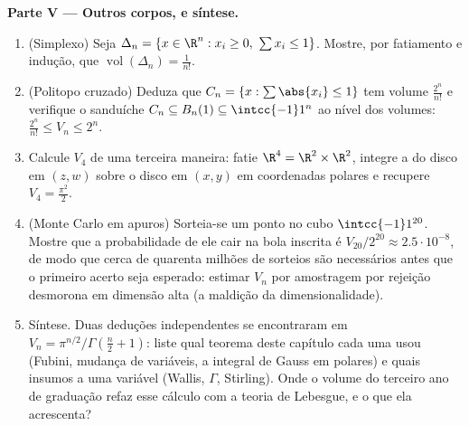 \begin{problem}[{Problema de fim de semana --- $V_n =
\pi^{n/2}/\Gamma(\frac n2 + 1)$, e a estranheza das
dimensões altas}]
\medskip
\noindent\textbf{Parte V --- Outros corpos, e síntese.}
\begin{enumerate}[resume]
  \item (Simplexo) Seja $\Delta_n = \{x \in \R^n : x_i \geq 0,\
        \sum x_i \leq 1\}$. Mostre, por fatiamento e indução, que
        $\operatorname{vol}(\Delta_n) = \frac1{n!}$.
  \item (Politopo cruzado) Deduza que $C_n = \{x :
        \sum\abs{x_i} \leq 1\}$ tem volume $\frac{2^n}{n!}$
        e verifique o sanduíche $C_n \subseteq B_n(1)
        \subseteq \intcc{-1}1^n$ ao nível dos volumes:
        $\frac{2^n}{n!} \leq V_n \leq 2^n$.
  \item Calcule $V_4$ de uma terceira maneira: fatie $\R^4 = \R^2 \times
        \R^2$, integre a \omterm{def:b2:multint:domain}{área} do disco em $(z, w)$ sobre
        o disco em $(x, y)$ em coordenadas polares e recupere
        $V_4 = \frac{\pi^2}2$.
  \item (Monte Carlo em apuros) Sorteia-se um ponto 
        no cubo $\intcc{-1}1^{20}$. Mostre que a
        probabilidade de ele cair na bola inscrita é
        $V_{20}/2^{20} \approx 2.5\cdot10^{-8}$, de modo que cerca de
        quarenta milhões de sorteios são necessários antes que o primeiro acerto
        seja esperado: estimar $V_n$ por amostragem por rejeição
        desmorona em dimensão alta (a maldição da
        dimensionalidade).
  \item Síntese. Duas deduções independentes se encontraram em $V_n =
        \pi^{n/2}/\Gamma(\frac n2 + 1)$: liste qual teorema
        deste capítulo cada uma usou (Fubini, mudança de
        variáveis, a integral de Gauss em polares) e quais
        insumos a uma variável (Wallis, $\Gamma$, Stirling).
        Onde o volume do terceiro ano de graduação refaz esse cálculo
        com a teoria de Lebesgue, e o que ela acrescenta?
\end{enumerate}
\end{problem}

